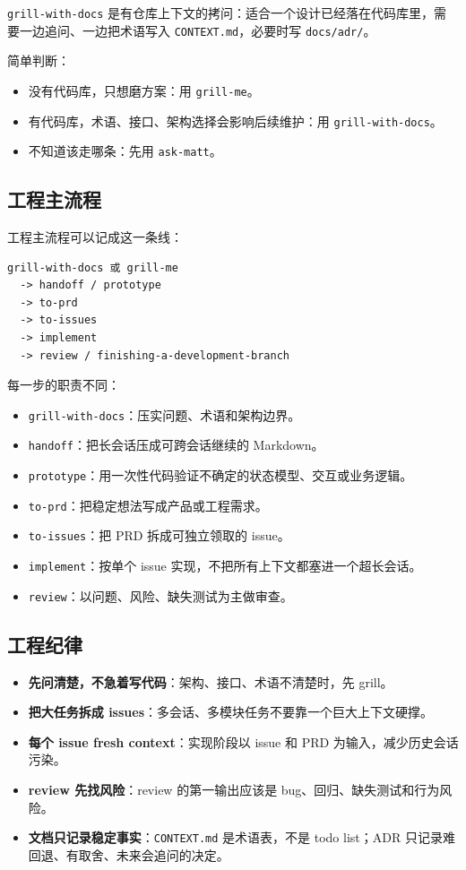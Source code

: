 \documentclass[UTF8,a4paper,11pt,fontset=none]{ctexart}
\newcommand{\skill}[1]{\texttt{#1}}
\newcommand{\file}[1]{\texttt{#1}}
\newcommand{\keypoint}[1]{\textbf{#1}}
\begin{document}
\skill{grill-with-docs} 是有仓库上下文的拷问：适合一个设计已经落在代码库里，需要一边追问、一边把术语写入 \file{CONTEXT.md}，必要时写 \file{docs/adr/}。

简单判断：

\begin{itemize}
  \item 没有代码库，只想磨方案：用 \skill{grill-me}。
  \item 有代码库，术语、接口、架构选择会影响后续维护：用 \skill{grill-with-docs}。
  \item 不知道该走哪条：先用 \skill{ask-matt}。
\end{itemize}

\subsection{工程主流程}

工程主流程可以记成这一条线：

\begin{lstlisting}
grill-with-docs 或 grill-me
  -> handoff / prototype
  -> to-prd
  -> to-issues
  -> implement
  -> review / finishing-a-development-branch
\end{lstlisting}

每一步的职责不同：

\begin{itemize}
  \item \skill{grill-with-docs}：压实问题、术语和架构边界。
  \item \skill{handoff}：把长会话压成可跨会话继续的 Markdown。
  \item \skill{prototype}：用一次性代码验证不确定的状态模型、交互或业务逻辑。
  \item \skill{to-prd}：把稳定想法写成产品或工程需求。
  \item \skill{to-issues}：把 PRD 拆成可独立领取的 issue。
  \item \skill{implement}：按单个 issue 实现，不把所有上下文都塞进一个超长会话。
  \item \skill{review}：以问题、风险、缺失测试为主做审查。
\end{itemize}

\subsection{工程纪律}

\begin{itemize}
  \item \keypoint{先问清楚，不急着写代码}：架构、接口、术语不清楚时，先 grill。
  \item \keypoint{把大任务拆成 issues}：多会话、多模块任务不要靠一个巨大上下文硬撑。
  \item \keypoint{每个 issue fresh context}：实现阶段以 issue 和 PRD 为输入，减少历史会话污染。
  \item \keypoint{review 先找风险}：review 的第一输出应该是 bug、回归、缺失测试和行为风险。
  \item \keypoint{文档只记录稳定事实}：\file{CONTEXT.md} 是术语表，不是 todo list；ADR 只记录难回退、有取舍、未来会追问的决定。
\end{itemize}
\end{document}
